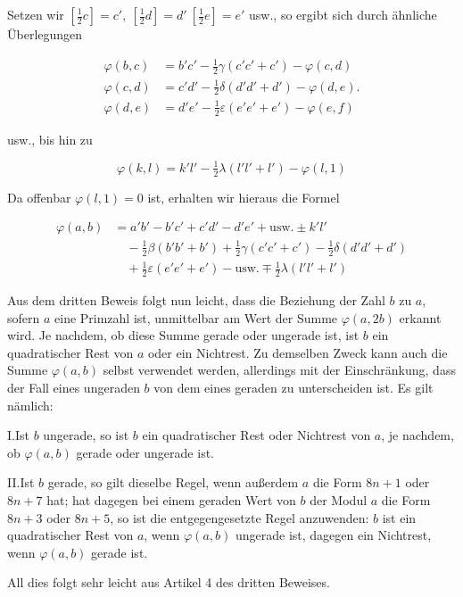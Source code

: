 Setzen wir $[\frac12c]=c',\ [\frac12d]=d'\ [\frac12e]=e'$ usw., so ergibt sich durch ähnliche Überlegungen

\[
\begin{aligned}
\varphi(b,c)&=b'c'-\tfrac12\gamma(c'c'+c')-\varphi(c,d)\\
\varphi(c,d)&=c'd'-\tfrac12\delta(d'd'+d')-\varphi(d,e)\mathord{.}\\
\varphi(d,e)&=d'e'-\tfrac12\varepsilon(e'e'+e')-\varphi(e,f)
\end{aligned}
\]

usw., bis hin zu

\[
\varphi(k,l)=k'l'-\tfrac12\lambda(l'l'+l')-\varphi(l,1)
\]

Da offenbar $\varphi(l,1)=0$ ist, erhalten wir hieraus die Formel

\[
\begin{aligned}
\varphi(a,b)&=a'b'-b'c'+c'd'-d'e'+\text{usw.}\pm k'l'\\
&\quad-\tfrac12\beta(b'b'+b')+\tfrac12\gamma(c'c'+c')-\tfrac12\delta(d'd'+d')\\
&\quad+\tfrac12\varepsilon(e'e'+e')-\text{usw.}\mp\tfrac12\lambda(l'l'+l')
\end{aligned}
\]


Aus dem dritten Beweis folgt nun leicht, dass die Beziehung der Zahl $b$ zu $a$, sofern $a$ eine Primzahl ist, unmittelbar am Wert der Summe $\varphi(a,2b)$ erkannt wird. Je nachdem, ob diese Summe gerade oder ungerade ist, ist $b$ ein quadratischer Rest von $a$ oder ein Nichtrest. Zu demselben Zweck kann auch die Summe $\varphi(a,b)$ selbst verwendet werden, allerdings mit der Einschränkung, dass der Fall eines ungeraden $b$ von dem eines geraden zu unterscheiden ist. Es gilt nämlich:

I.\quad Ist $b$ ungerade, so ist $b$ ein quadratischer Rest oder Nichtrest von $a$, je nachdem, ob $\varphi(a,b)$ gerade oder ungerade ist.

II.\quad Ist $b$ gerade, so gilt dieselbe Regel, wenn außerdem $a$ die Form $8n+1$ oder $8n+7$ hat; hat dagegen bei einem geraden Wert von $b$ der Modul $a$ die Form $8n+3$ oder $8n+5$, so ist die entgegengesetzte Regel anzuwenden: $b$ ist ein quadratischer Rest von $a$, wenn $\varphi(a,b)$ ungerade ist, dagegen ein Nichtrest, wenn $\varphi(a,b)$ gerade ist.

All dies folgt sehr leicht aus Artikel 4 des dritten Beweises.

